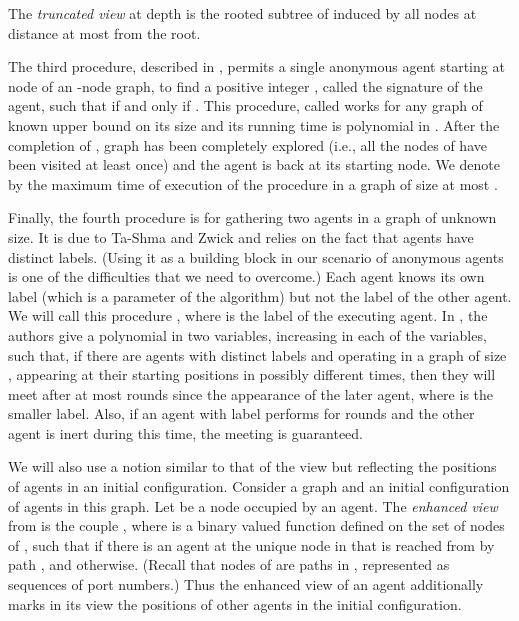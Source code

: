 \documentclass[11pt]{article}
\begin{document}
The {\em truncated view}  at depth  is the rooted subtree of   induced by all nodes at distance  at most  from the root.


The third procedure, described in \cite{CKP},  permits a single anonymous agent starting at node  of an -node graph, to find a  positive integer ,
called the signature of the agent, such that 
 if and only if . This procedure, called  works for any graph  of known upper bound  on its size and 
its running time is polynomial in . After the completion of , {graph  has been completely explored (i.e., all the nodes of  have been visited at least once) and} the agent is back at its starting node.
We denote by  the maximum time of execution of the procedure  in a graph of size at most .


Finally, the fourth procedure is for gathering two agents in a graph of unknown size. It is due to Ta-Shma and Zwick \cite{TSZ14} and relies on the
fact that agents have distinct labels. (Using it as a building block in our scenario of anonymous agents is one of the difficulties that we need to overcome.)
Each agent knows its own label (which is a parameter of the algorithm) but not the label of the other agent.
We will call this procedure , where  is the label of the executing agent. In  \cite{TSZ14}, the authors give a polynomial 
in two variables, increasing in each of the variables,
such that, if there are agents with distinct labels  and  operating in a graph of size , appearing at their starting positions in possibly
different times, then they will meet after at most  rounds since the appearance of the later agent, where  is the smaller label.
Also, if an agent with label   performs  for  rounds and the other agent is inert during this time, the meeting is guaranteed.

We will also use a notion similar to that of the view but reflecting the positions of agents in an initial configuration.
Consider a graph  and an initial configuration of agents in this graph. Let  be a node occupied by an agent. The {\em enhanced view} from  is the couple 
 , where  is a binary valued function defined on the set of nodes of , such that  if there is an agent at the unique node  in 
 that is reached from  by path , and  otherwise. (Recall that nodes of  are paths in , represented as sequences of port numbers.)
 Thus the enhanced view of an agent additionally marks in its view the positions of other agents in the initial configuration.
 
\end{document}
